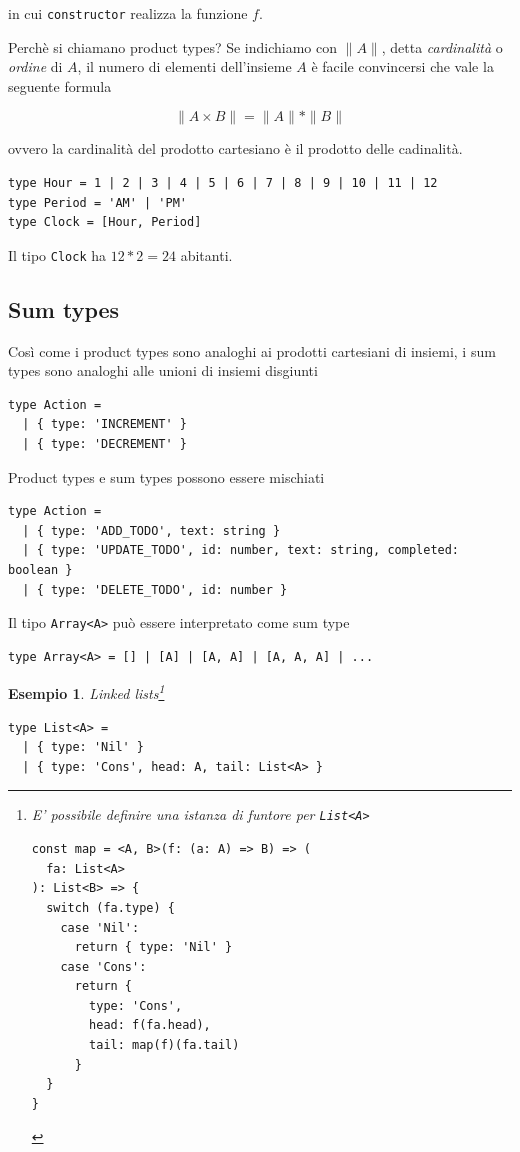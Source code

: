 \documentclass[12pt]{article}
\newtheorem{example}{Esempio}
\begin{document}
in cui \texttt{constructor} realizza la funzione $f$.

Perchè si chiamano product types? Se indichiamo con $\|A\|$, detta \emph{cardinalità} o \emph{ordine} di $A$, il numero di elementi
dell'insieme $A$ è facile convincersi che vale la seguente formula

$$
\|A \times B\| = \|A\| * \|B\|
$$

ovvero la cardinalità del prodotto cartesiano è il prodotto delle cadinalità.

\begin{verbatim}
type Hour = 1 | 2 | 3 | 4 | 5 | 6 | 7 | 8 | 9 | 10 | 11 | 12
type Period = 'AM' | 'PM'
type Clock = [Hour, Period]
\end{verbatim}

Il tipo \texttt{Clock} ha $12 * 2 = 24$ abitanti.

\subsection{Sum types}

Così come i product types sono analoghi ai prodotti cartesiani di insiemi, i sum types sono analoghi alle unioni di insiemi disgiunti

\begin{verbatim}
type Action =
  | { type: 'INCREMENT' }
  | { type: 'DECREMENT' }
\end{verbatim}

Product types e sum types possono essere mischiati

\begin{verbatim}
type Action =
  | { type: 'ADD_TODO', text: string }
  | { type: 'UPDATE_TODO', id: number, text: string, completed: boolean }
  | { type: 'DELETE_TODO', id: number }
\end{verbatim}

Il tipo \texttt{Array<A>} può essere interpretato come sum type

\begin{verbatim}
type Array<A> = [] | [A] | [A, A] | [A, A, A] | ...
\end{verbatim}

\begin{example}
Linked lists\footnote{E' possibile definire una istanza di funtore per \texttt{List<A>}

\begin{verbatim}
const map = <A, B>(f: (a: A) => B) => (
  fa: List<A>
): List<B> => {
  switch (fa.type) {
    case 'Nil':
      return { type: 'Nil' }
    case 'Cons':
      return {
        type: 'Cons',
        head: f(fa.head),
        tail: map(f)(fa.tail)
      }
  }
}
\end{verbatim}
}

\begin{verbatim}
type List<A> =
  | { type: 'Nil' }
  | { type: 'Cons', head: A, tail: List<A> }
\end{verbatim}
\end{example}
\end{document}
